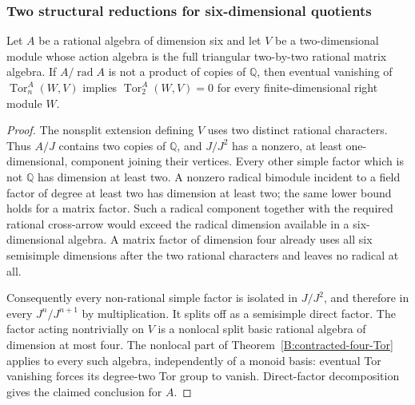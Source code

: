 \subsubsection{Two structural reductions for six-dimensional quotients}

\begin{lemma}\label{B:six-nonsplit-triangular-row}
Let $A$ be a rational algebra of dimension six and let $V$ be a
two-dimensional module whose action algebra is the full triangular
two-by-two rational matrix algebra.  If $A/\operatorname{rad}A$
is not a product of copies of $\mathbb Q$, then eventual vanishing
of $\operatorname{Tor}^A_n(W,V)$ implies
$\operatorname{Tor}^A_2(W,V)=0$ for every finite-dimensional right
module $W$.
\end{lemma}
\begin{proof}
The nonsplit extension defining $V$ uses two distinct rational
characters.  Thus $A/J$ contains two copies of $\mathbb Q$, and
$J/J^2$ has a nonzero, at least one-dimensional, component joining
their vertices.  Every other simple factor which is not
$\mathbb Q$ has dimension at least two.  A nonzero radical
bimodule incident to a field factor of degree at least two has
dimension at least two; the same lower bound holds for a matrix
factor.  Such a radical component together with the required
rational cross-arrow would exceed the radical dimension available
in a six-dimensional algebra.  A matrix factor of dimension four
already uses all six semisimple dimensions after the two rational
characters and leaves no radical at all.

Consequently every non-rational simple factor is isolated in
$J/J^2$, and therefore in every $J^n/J^{n+1}$ by multiplication.
It splits off as a semisimple direct factor.  The factor acting
nontrivially on $V$ is a nonlocal split basic rational algebra of
dimension at most four.  The nonlocal part of
Theorem~\ref{B:contracted-four-Tor} applies to every such algebra,
independently of a monoid basis: eventual Tor vanishing forces its
degree-two Tor group to vanish.  Direct-factor decomposition gives
the claimed conclusion for $A$.
\end{proof}

